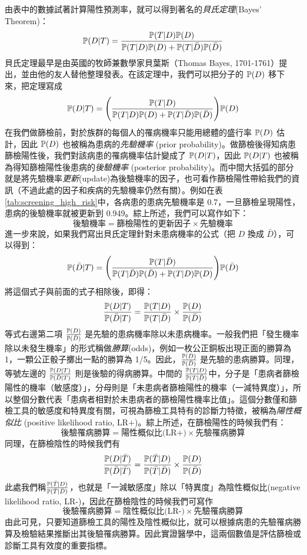     由表中的數據試著計算陽性預測率，就可以得到著名的\textit{貝氏定理}(Bayes' Theorem)：
    \[\mathbb{P}(D|T) = \frac{\mathbb{P}(T|D)\mathbb{P}(D)}{\mathbb{P}(T|D)\mathbb{P}(D) + \mathbb{P}(T|\bar{D})\mathbb{P}(\bar{D})}\]
    貝氏定理最早是由英國的牧師兼數學家貝葉斯（Thomas Bayes, 1701-1761）提出，並由他的友人替他整理發表。在該定理中，我們可以把分子的 $\mathbb{P}(D)$ 移下來，把定理寫成
    \[\mathbb{P}(D|T) = \Bigg(\frac{\mathbb{P}(T|D)}{\mathbb{P}(T|D)\mathbb{P}(D) + \mathbb{P}(T|\bar{D})\mathbb{P}(\bar{D})}\Bigg) \mathbb{P}(D)\]
    在我們做篩檢前，對於族群的每個人的罹病機率只能用總體的盛行率 $\mathbb{P}(D)$ 估計，因此 $\mathbb{P}(D)$ 也被稱為患病的\textit{先驗機率} (prior probability)。做篩檢後得知病患篩檢陽性後，我們對該病患的罹病機率估計變成了 $\mathbb{P}(D|T)$，因此 $\mathbb{P}(D|T)$ 也被稱為得知篩檢陽性後患病的\textit{後驗機率} (posterior probability)。而中間大括弧的部分就是將先驗機率\textit{更新}(update)為後驗機率的因子，也可看作篩檢陽性帶給我們的資訊（不過此處的因子和疾病的先驗機率仍然有關）。例如在表\ref{tab:screening_high_risk}中，各病患的患病先驗機率是 0.7，一旦篩檢呈現陽性，患病的後驗機率就被更新到 0.949。綜上所述，我們可以寫作如下：
    \[\text{後驗機率}=\text{篩檢陽性的更新因子}\times\text{先驗機率}\]
    進一步來說，如果我們寫出貝氏定理針對未患病機率的公式（把 $D$ 換成 $\bar{D}$），可以得到：
    \[\mathbb{P}(\bar{D}|T) = \Bigg(\frac{\mathbb{P}(T|\bar{D})}{\mathbb{P}(T|\bar{D})\mathbb{P}(\bar{D}) + \mathbb{P}(T|D)\mathbb{P}(D)}\Bigg) \mathbb{P}(\bar{D})\]
    將這個式子與前面的式子相除後，即得：
    \[\frac{\mathbb{P}(D|T)}{\mathbb{P}(\bar{D}|T)} = \frac{\mathbb{P}(T|D)}{\mathbb{P}(T|\bar{D})} \times \frac{\mathbb{P}(D)}{\mathbb{P}(\bar{D})}\]
    等式右邊第二項 $\frac{\mathbb{P}(D)}{\mathbb{P}(\bar{D})}$ 是先驗的患病機率除以未患病機率。一般我們把「發生機率除以未發生機率」的形式稱做\textit{勝算}(odds)，例如一枚公正銅板出現正面的勝算為 1，一顆公正骰子擲出一點的勝算為 1/5。因此，$\frac{\mathbb{P}(D)}{\mathbb{P}(\bar{D})}$ 是先驗的患病勝算。同理，等號左邊的 $\frac{\mathbb{P}(D|T)}{\mathbb{P}(\bar{D}|T)}$ 則是後驗的得病勝算。中間的 $\frac{\mathbb{P}(T|D)}{\mathbb{P}(T|\bar{D})}$中，分子是「患病者篩檢陽性的機率（敏感度）」，分母則是「未患病者篩檢陽性的機率（一減特異度）」，所以整個分數代表「患病者相對於未患病者的篩檢陽性機率比值」。這個分數僅和篩檢工具的敏感度和特異度有關，可視為篩檢工具特有的診斷力特徵，被稱為\textit{陽性概似比} (positive likelihood ratio, LR+)。綜上所述，在篩檢陽性的時候我們有：
    \[\text{後驗罹病勝算}=\text{陽性概似比(LR+)}\times\text{先驗罹病勝算}\]
    同理，在篩檢陰性的時候我們有
    \[\frac{\mathbb{P}(D|\bar{T})}{\mathbb{P}(\bar{D}|\bar{T})} = \frac{\mathbb{P}(\bar{T}|D)}{\mathbb{P}(\bar{T}|\bar{D})} \times \frac{\mathbb{P}(D)}{\mathbb{P}(\bar{D})}\]
    此處我們稱$\frac{\mathbb{P}(\bar{T}|D)}{\mathbb{P}(\bar{T}|\bar{D})}$，也就是「一減敏感度」除以「特異度」為陰性概似比(negative likelihood ratio, LR-)，因此在篩檢陰性的時候我們可寫作
    \[\text{後驗罹病勝算}=\text{陰性概似比(LR-)}\times\text{先驗罹病勝算}\]
    由此可見，只要知道篩檢工具的陽性及陰性概似比，就可以根據病患的先驗罹病勝算及檢驗結果推斷出其後驗罹病勝算。因此實證醫學中，這兩個數值是評估篩檢或診斷工具有效度的重要指標。

